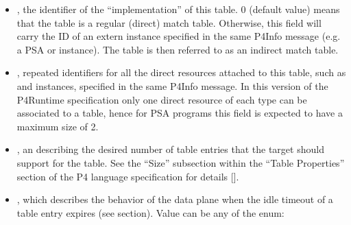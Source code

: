 \documentclass[11pt]{article}
\begin{document}
{\begin{itemize}
\item{}
, the  identifier of the \textquotedblleft{}implementation\textquotedblright{} of this
table. 0 (default value) means that the table is a regular (direct) match
table. Otherwise, this field will carry the ID of an extern instance specified
in the same P4Info message (e.g. a PSA  or 
instance). The table is then referred to as an indirect match table.%

\item{}
, repeated  identifiers for all the direct
resources attached to this table, such as  and 
instances, specified in the same P4Info message. In this version of the
P4Runtime specification only one direct resource of each type can be
associated to a table, hence for PSA programs this field is expected to have a
maximum size of 2.%

\item{}
, an  describing the desired number of table entries that the
target should support for the table.  See the \textquotedblleft{}Size\textquotedblright{} subsection within the
\textquotedblleft{}Table Properties\textquotedblright{} section of the P4 language specification for details
[].%

\item{}
, which describes the behavior of the data plane when
the idle timeout of a table entry expires (see
 section). Value can be any of the
 enum:%


\end{itemize}}
\end{document}
